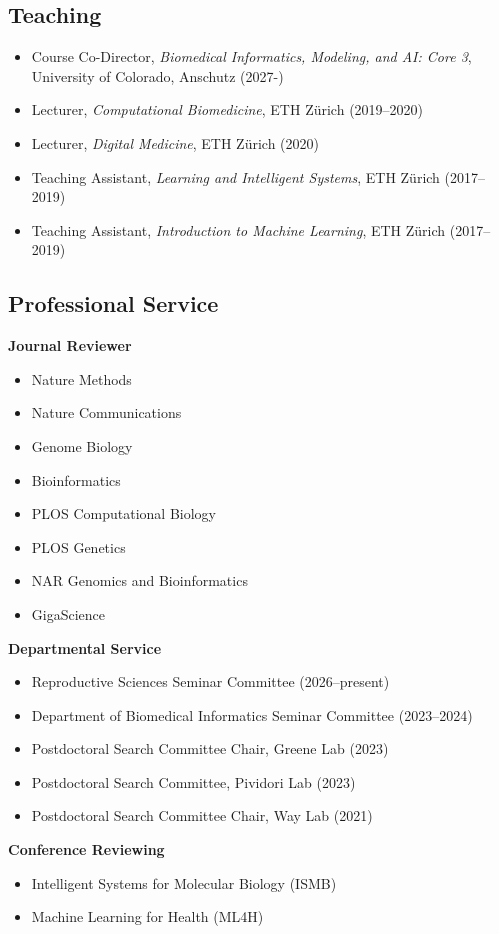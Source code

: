 
\subsection*{Teaching}

\begin{itemize}
  \item Course Co-Director, \textit{Biomedical Informatics, Modeling, and AI: Core 3}, University of Colorado, Anschutz (2027-)
  \item Lecturer, \textit{Computational Biomedicine}, ETH Zürich (2019--2020)
  \item Lecturer, \textit{Digital Medicine}, ETH Zürich (2020)
  \item Teaching Assistant, \textit{Learning and Intelligent Systems}, ETH Zürich (2017--2019)
  \item Teaching Assistant, \textit{Introduction to Machine Learning}, ETH Zürich (2017--2019)
\end{itemize}

\subsection*{Professional Service}

\textbf{Journal Reviewer}

\begin{itemize}
  \item Nature Methods
  \item Nature Communications
  \item Genome Biology
  \item Bioinformatics
  \item PLOS Computational Biology
  \item PLOS Genetics
  \item NAR Genomics and Bioinformatics
  \item GigaScience
\end{itemize}

\textbf{Departmental Service}

\begin{itemize}
  \item Reproductive Sciences Seminar Committee (2026--present)
  \item Department of Biomedical Informatics Seminar Committee (2023--2024)
  \item Postdoctoral Search Committee Chair, Greene Lab (2023)
  \item Postdoctoral Search Committee, Pividori Lab (2023)
  \item Postdoctoral Search Committee Chair, Way Lab (2021)
\end{itemize}

\textbf{Conference Reviewing}

\begin{itemize}
  \item Intelligent Systems for Molecular Biology (ISMB)
  \item Machine Learning for Health (ML4H)
\end{itemize}